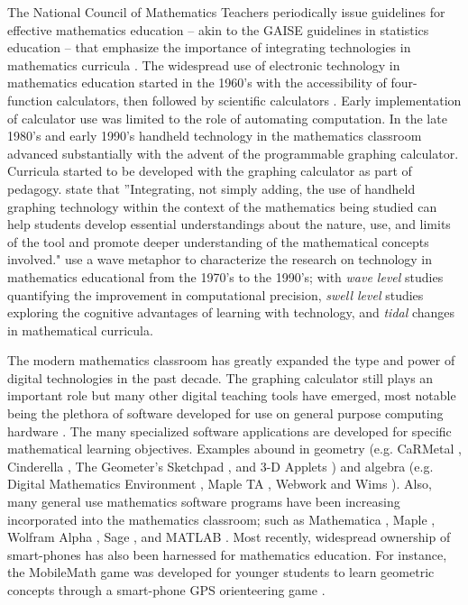 \documentclass[11pt]{isuthesis}
\begin{document}
The National Council of Mathematics Teachers periodically issue guidelines for effective mathematics education -- akin to the GAISE guidelines in statistics education -- that emphasize the importance of integrating technologies in mathematics curricula \citep{nctm2000standards}. The widespread use of electronic technology in mathematics education started in the 1960's with the accessibility of four-function calculators, then followed by scientific calculators \citep{trouche2010handheld}. Early implementation of calculator use was limited to the role of automating computation. In the late 1980's and early 1990's handheld technology in the mathematics classroom advanced substantially with the advent of the programmable graphing calculator. Curricula started to be developed with the graphing calculator as part of pedagogy. \citet{burrill2002handheld} state that ''Integrating, not simply adding, the use of handheld graphing technology within the context of the mathematics being studied can help students develop essential understandings about the nature, use, and limits of the tool and promote deeper understanding of the mathematical concepts involved." \citet{kaput1994technology} use a wave metaphor to characterize the research on technology in mathematics educational from the 1970's to the 1990's; with \textit{wave level} studies quantifying the improvement in computational precision, \textit{swell level} studies exploring the cognitive advantages of learning with technology, and \textit{tidal} changes in mathematical curricula.  

The modern mathematics classroom has greatly expanded the type and power of digital technologies in the past decade. The graphing calculator still plays an important role but many other digital teaching tools have emerged, most notable being the plethora of software developed for use on general purpose computing hardware \citep{trouche2010handheld}. The many specialized software applications are developed for specific mathematical learning objectives. Examples abound in geometry (e.g. CaRMetal \citep{CaRMetal}, Cinderella \citep{cinderella}, The Geometer's Sketchpad \citep{jackiw2002geometer}, and 3-D Applets \citep{boon2009designer}) and algebra (e.g. Digital Mathematics Environment \citep{DME}, Maple TA \citep{MapleTA}, Webwork \citep{gage2002webwork} and Wims \citep{wims}). Also, many general use mathematics software programs have been increasing incorporated into the mathematics classroom; such as Mathematica \citep{Mathematica}, Maple \citep{Maple}, Wolfram Alpha \citep{wolframalpha}, Sage \citep{sage}, and MATLAB \citep{MATLAB}. Most recently, widespread ownership of smart-phones has also been harnessed for mathematics education. For instance, the MobileMath game was developed for younger students to learn geometric concepts through a smart-phone GPS orienteering game \citep{wijers2010mobilemath}. 
\end{document}

